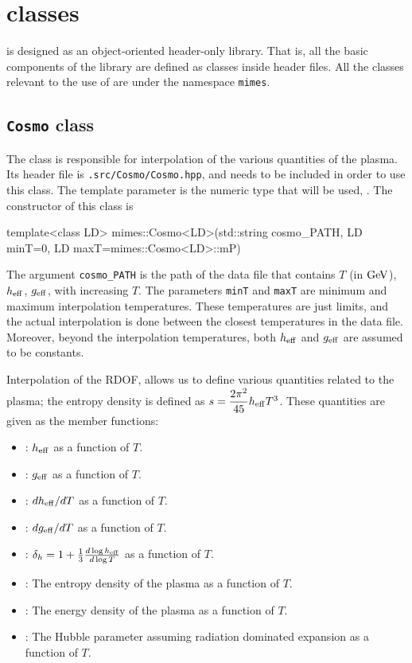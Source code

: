 \documentclass[11pt,a4paper]{article}
\begin{document}
\section{\CPP classes}\label{app:classes}
\setcounter{equation}{0}
%
\mimes is designed as an object-oriented header-only library. That is, all the basic components of the library are defined as classes inside header files. All the classes relevant to the use of \mimes are under the namespace {\tt mimes}.

\subsection{{\tt Cosmo} class}
%
The  class is responsible for interpolation of the various quantities of the plasma. Its header file is {\tt \mimes.src/Cosmo/Cosmo.hpp}, and needs to be included in order to use this class. The template parameter  is the numeric type that will be used, \eg {}. The constructor of this class is
%
\begin{cpp}
	template<class LD>
	mimes::Cosmo<LD>(std::string cosmo_PATH, LD minT=0, LD maxT=mimes::Cosmo<LD>::mP)
\end{cpp}
%
The argument {\tt cosmo\_PATH} is the path of the data file that contains $T$ (in ${\rm GeV}$), $h_{\rm eff}{}$, $g_{\rm eff}{}$, with increasing $T$. The parameters {\tt minT} and {\tt maxT} are minimum and maximum interpolation temperatures. These temperatures are just limits, and the actual interpolation is done between the closest temperatures in the data file. Moreover, beyond the interpolation temperatures, both $h_{\rm eff}{}$ and $g_{\rm eff}{}$ are assumed to be constants.   

Interpolation of the RDOF, allows us to define various quantities related to the plasma; \eg the entropy density is defined as $s = \dfrac{2\pi^2}{45} h_{\rm eff}{} T^3$. These quantities are given as the member functions:
%
\begin{itemize}
	\item {}: $h_{\rm eff}{}$ as a function of $T$.
	\item {}: $g_{\rm eff}{}$ as a function of $T$.
	\item {}: $dh_{\rm eff}{}/dT$ as a function of $T$.
	\item {}: $dg_{\rm eff}{}/dT$ as a function of $T$.
	\item {}: $\delta_h = 1 + \frac{1}{3} \frac{d\log h_{\rm eff}{}}{d\log T}$ as a function of $T$.
	\item {}: The entropy density of the plasma as a function of $T$.
	\item {}: The energy density of the plasma as a function of $T$.
	\item {}: The Hubble parameter assuming radiation dominated expansion as a function of $T$.
\end{itemize}
\end{document}
